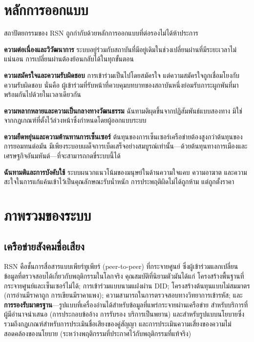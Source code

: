 \documentclass[11pt,a4paper,twocolumn]{article}
\begin{document}
\section{หลักการออกแบบ}

สถาปัตยกรรมของ RSN ถูกกำกับด้วยหลักการออกแบบที่ต่อรองไม่ได้ห้าประการ

\textbf{ความต่อเนื่องและวิวัฒนาการ} ระบบอยู่ร่วมกับสถาบันที่มีอยู่เดิมในช่วงเปลี่ยนผ่านที่มีระยะเวลาไม่แน่นอน การเปลี่ยนผ่านต้องย้อนกลับได้ในทุกขั้นตอน

\textbf{ความสมัครใจและความรับผิดชอบ} การเข้าร่วมเป็นไปโดยสมัครใจ แต่ความสมัครใจถูกเชื่อมโยงกับความรับผิดชอบ นั่นคือ ผู้เข้าร่วมที่รับหน้าที่ควบคุมบทบาทของสถาบันหนึ่งย่อมรับภาระผูกพันที่มาพร้อมกันไปด้วยในเวลาเดียวกัน

\textbf{ความหลากหลายและความเป็นกลางทางวัฒนธรรม} ฉันทามติผุดขึ้นจากปฏิสัมพันธ์แบบสองทาง มิใช่จากกฎเกณฑ์ที่ตั้งไว้ล่วงหน้าซึ่งกำหนดโดยผู้ออกแบบระบบ

\textbf{ความยืดหยุ่นและความต้านทานการเซ็นเซอร์} ต้นทุนของการเซ็นเซอร์เครือข่ายต้องสูงกว่าต้นทุนของการยอมทนต่อมัน มีเพียงระบอบเผด็จการเบ็ดเสร็จอย่างสมบูรณ์เท่านั้น---ด้วยต้นทุนทางการเมืองและเศรษฐกิจอันมหันต์---ที่จะสามารถกดขี่ระบบนี้ได้

\textbf{ฉันทามติและการบังคับใช้} ระบบผนวกแนวโน้มของมนุษย์ในด้านความใจแคบ ความอาฆาต และความสะใจในการแก้แค้นเข้าไว้เป็นคุณลักษณะรับน้ำหนัก การประพฤติผิดไม่ได้ถูกห้าม แต่ถูกตั้งราคา

\section{ภาพรวมของระบบ}

\subsection{เครือข่ายสังคมชื่อเสียง}

RSN คือชั้นการสื่อสารแบบเพียร์ทูเพียร์ (peer-to-peer) ที่กระจายศูนย์ ซึ่งผู้เข้าร่วมแลกเปลี่ยนข้อมูลที่ตรวจสอบได้เกี่ยวกับพฤติกรรมในโลกจริง คุณสมบัติที่นิยามตัวมันได้แก่ โครงสร้างพื้นฐานที่กระจายศูนย์และเซ็นเซอร์ไม่ได้; การเข้าร่วมแบบนามแฝงผ่าน DID; โครงสร้างต้นทุนแบบไม่สมมาตร (การอ่านมีราคาถูก การเขียนมีราคาแพง); ความสามารถในการตรวจสอบทางวิทยาการเข้ารหัส; และ\textbf{การรองรับมาตรฐาน}---รูปแบบที่เครื่องอ่านได้สำหรับข้อมูลที่แพร่กระจายผ่านเครือข่าย สำหรับบริการที่ผู้มีอำนาจนำเสนอ (การประกอบข้ออ้าง การรับรอง บริการเป็นพยาน) และสำหรับรูปแบบนโยบายซึ่งรวมถึงกฎเกณฑ์สำหรับการประเมินชื่อเสียงของคู่สัญญา และการประเมินความเสี่ยงของความไม่สอดคล้องของนโยบาย (ระหว่างพฤติกรรมที่ประกาศไว้กับพฤติกรรมที่แท้จริง)
\end{document}
